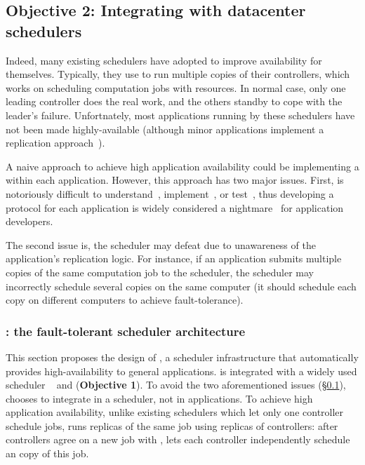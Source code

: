 \vspace{-.15in}\subsection{Objective 2: Integrating \falcon with datacenter 
schedulers}\label{sec:scheduler}\vspace{-.075in}

Indeed, many existing schedulers have adopted \paxos to improve availability 
for themselves. Typically, they use \paxos to run multiple copies of their 
controllers, which works on scheduling computation jobs with resources. In 
normal case, only one leading controller does the real work, and the others 
standby to cope with the leader's failure. Unfortnately, most applications 
running by these schedulers have not been made highly-available (although minor 
applications implement a replication 
approach~\cite{mapreduce,dolly:nsdi13}).

A naive approach to achieve high application availability could be implementing 
a \paxos within each application. However, this approach has two major issues. 
First, \paxos is notoriously difficult to 
understand~\cite{raft:usenix14,paxos:simple}, implement~\cite{paxos:practical, 
paxos:live}, or test~\cite{modist:nsdi09,demeter:sosp11}, thus developing a 
\paxos protocol for each application is widely considered a 
nightmare~\cite{modist:nsdi09,demeter:sosp11,paxos:live} for application 
developers.

The second issue is, the scheduler may defeat \paxos due to unawareness of the 
application's \paxos replication logic. For instance, if an application submits 
multiple copies of the same computation job to the scheduler, the scheduler may 
incorrectly schedule several copies on the same computer (it should schedule 
each copy on different computers to achieve \paxos fault-tolerance).

\vspace{-.15in}\subsubsection{\tripod: the fault-tolerant scheduler 
architecture} 
\label{sec:scheduler-arch}\vspace{-.075in}

This section proposes the design of \tripod, a scheduler infrastructure that 
automatically provides high-availability to general applications. \tripod 
is integrated with a widely used scheduler \mesos~\cite{mesos:nsdi11} and 
\falcon (\textbf{Objective 1}). To avoid the two aforementioned issues 
(\S\ref{sec:scheduler}), \tripod chooses 
to integrate \paxos in a scheduler, not in applications. To achieve high
application availability, unlike existing schedulers which let only one 
controller schedule jobs, \tripod runs replicas of the same job using replicas 
of controllers: after controllers agree on a new job with \falcon, \tripod lets 
each controller independently schedule an copy of this job.


